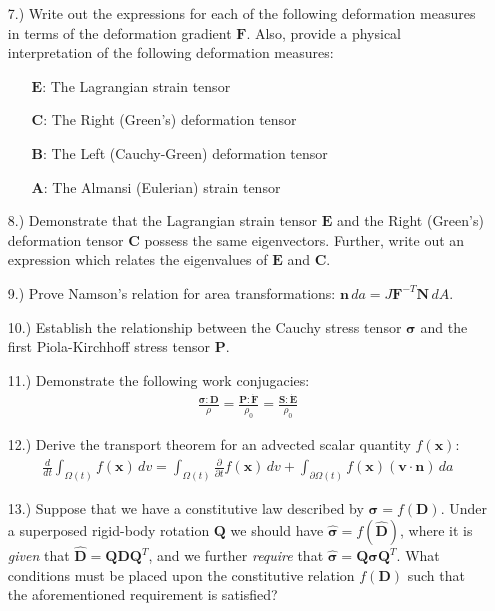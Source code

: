 \documentclass[12pt]{article}
\begin{document}
\begin{itemize}
	\item[7.)] Write out the expressions for each of the following deformation measures in terms of the deformation gradient $\mathbf{F}$. Also, provide a physical interpretation of the following deformation measures:
	\begin{itemize}
		\item[$\mathbf{E}$:] The Lagrangian strain tensor
		\item[$\mathbf{C}$:] The Right (Green's) deformation tensor
		\item[$\mathbf{B}$:] The Left (Cauchy-Green) deformation tensor
		\item[$\mathbf{A}$:] The Almansi (Eulerian) strain tensor
	\end{itemize}
	\item[8.)] Demonstrate that the Lagrangian strain tensor $\mathbf{E}$ and the Right (Green's) deformation tensor $\mathbf{C}$ possess the same eigenvectors. Further, write out an expression which relates the eigenvalues of $\mathbf{E}$ and $\mathbf{C}$.
	\item[9.)] Prove Namson's relation for area transformations: $\mathbf{n} \, da = J \mathbf{F}^{-T} \mathbf{N} \, dA$.
	\item[10.)] Establish the relationship between the Cauchy stress tensor $\boldsymbol{\sigma}$ and the first Piola-Kirchhoff stress tensor $\mathbf{P}$.
	\item[11.)] Demonstrate the following work conjugacies:
	\begin{eqnarray}
		\frac{\boldsymbol{\sigma} \colon \mathbf{D}}{\rho} = \frac{\mathbf{P} \colon \dot{\mathbf{F}}}{\rho_0} = \frac{\mathbf{S} \colon \dot{\mathbf{E}}}{\rho_0} \nonumber
	\end{eqnarray}
	\item[12.)] Derive the transport theorem for an advected scalar quantity $f (\mathbf{x})$:
	\begin{eqnarray}
		\frac{d}{dt} \int_{\Omega (t)} f ( \mathbf{x} ) \, dv = \int_{\Omega (t)} \frac{\partial}{\partial t} f ( \mathbf{x} ) \, dv + \int_{\partial \Omega (t)} f ( \mathbf{x} ) (\mathbf{v} \cdot \mathbf{n}) \, da \nonumber
	\end{eqnarray}
	\item[13.)] Suppose that we have a constitutive law described by $\boldsymbol{\sigma} = f (\mathbf{D})$. Under a superposed rigid-body rotation $\mathbf{Q}$ we should have $\hat{\boldsymbol{\sigma}} = f (\hat{\mathbf{D}})$, where it is \textit{given} that $\hat{\mathbf{D}} = \mathbf{Q} \mathbf{D} \mathbf{Q}^T$, and we further \textit{require} that $\hat{\boldsymbol{\sigma}} = \mathbf{Q} \boldsymbol{\sigma} \mathbf{Q}^T$. What conditions must be placed upon the constitutive relation $f (\mathbf{D})$ such that the aforementioned requirement is satisfied?

\end{itemize}
\end{document}
